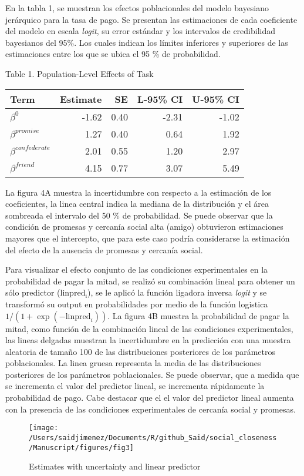\documentclass[]{article}
\begin{document}
En la tabla 1, se muestran los efectos poblacionales del modelo
bayesiano jerárquico para la tasa de pago. Se presentan las estimaciones
de cada coeficiente del modelo en escala \emph{logit}, su error estándar
y los intervalos de credibilidad bayesianos del 95\%. Los cuales indican
los límites inferiores y superiores de las estimaciones entre los que se
ubica el 95 \% de probabilidad.

Table 1. Population-Level Effects of Task

\begin{longtable}[]{@{}lrrrr@{}}
\toprule
Term & Estimate & SE & L-95\% CI & U-95\% CI\tabularnewline
\midrule
\endhead
\(\beta^0\) & -1.62 & 0.40 & -2.31 & -1.02\tabularnewline
\(\beta^{promise}\) & 1.27 & 0.40 & 0.64 & 1.92\tabularnewline
\(\beta^{confederate}\) & 2.01 & 0.55 & 1.20 & 2.97\tabularnewline
\(\beta^{friend}\) & 4.15 & 0.77 & 3.07 & 5.49\tabularnewline
\bottomrule
\end{longtable}

La figura 4A muestra la incertidumbre con respecto a la estimación de
los coeficientes, la linea central indica la mediana de la distribución
y el área sombreada el intervalo del 50 \% de probabilidad. Se puede
observar que la condición de promesas y cercanía social alta (amigo)
obtuvieron estimaciones mayores que el intercepto, que para este caso
podría considerarse la estimación del efecto de la ausencia de promesas
y cercanía social.

Para visualizar el efecto conjunto de las condiciones experimentales en
la probabilidad de pagar la mitad, se realizó su combinación lineal para
obtener un sólo predictor (\(\mathrm{linpred_i}\)), se le aplicó la
función ligadora inversa \emph{logit} y se transformó su output en
probabilidades por medio de la función logistica
\(1 / (1 + \exp(-\mathrm{linpred}_i))\). La figura 4B muestra la
probabilidad de pagar la mitad, como función de la combinación lineal de
las condiciones experimentales, las lineas delgadas muestran la
incertidumbre en la predicción con una muestra aleatoria de tamaño 100
de las distribuciones posteriores de los parámetros poblacionales. La
linea gruesa representa la media de las distribuciones posteriores de
los parámetros poblacionales. Se puede observar, que a medida que se
incrementa el valor del predictor lineal, se incrementa rápidamente la
probabilidad de pago. Cabe destacar que el el valor del predictor lineal
aumenta con la presencia de las condiciones experimentales de cercanía
social y promesas.

\begin{figure}

{\centering \texttt{[image: /Users/saidjimenez/Documents/R/github\_Said/social\_closeness/Manuscript/figures/fig3]} 

}

\caption{Estimates with uncertainty and linear predictor}\label{fig:fig4}
\end{figure}
\end{document}
